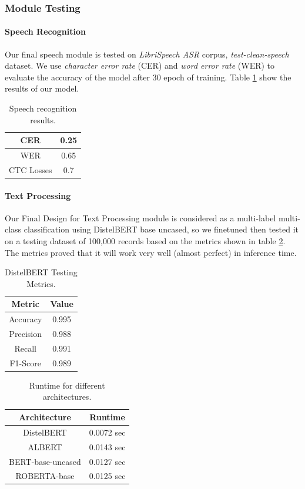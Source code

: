 \subsubsection{Module Testing}

\paragraph{Speech Recognition}
Our final speech module is tested on \emph{LibriSpeech ASR} corpus, \emph{test-clean-speech} dataset. We use \emph{character error rate} (CER) and \emph{word error rate} (WER) to evaluate the accuracy of the model after $30$ epoch of training. Table \ref{tab:speech_results} show the results of our model.
\begin{table}[ht]
\centering
\caption{Speech recognition results.}
\begin{tabular}[t]{| c | c |}
\hline
CER & 0.25 \\
\hline
WER & 0.65 \\
\hline
CTC Losses & 0.7 \\
\hline
\end{tabular}
\label{tab:speech_results}
\end{table}

\paragraph{Text Processing}
Our Final Design for Text Processing module is considered as a multi-label multi-class classification using DistelBERT base uncased, so we finetuned then tested it on  a testing dataset of 100,000 records based on the metrics shown in table \ref{tab:text_metrics}. The metrics proved that it will work very well (almost perfect) in inference time.

\begin{table}[ht]
\centering
\caption{DistelBERT Testing Metrics.}
\begin{tabular}[t]{| c | c |}
\hline
Metric & Value \\
\hline
Accuracy & 0.995 \\
\hline
Precision & 0.988 \\
\hline
Recall & 0.991\\
\hline
F1-Score & 0.989 \\
\hline
\end{tabular}
\label{tab:text_metrics}
\end{table}

\begin{table}[ht]
\centering
\caption{Runtime for different architectures.}
\begin{tabular}[t]{| c | c |}
\hline
Architecture & Runtime \\
\hline
DistelBERT & 0.0072 sec \\
\hline
ALBERT & 0.0143 sec \\
\hline
BERT-base-uncased & 0.0127 sec \\
\hline
ROBERTA-base & 0.0125 sec \\
\hline
\end{tabular}
\label{tab:text_runtime}
\end{table}

